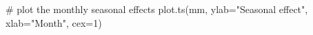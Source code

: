 \begin{Schunk}
\begin{Sinput}
 # plot the monthly seasonal effects
 plot.ts(mm, ylab="Seasonal effect", xlab="Month", cex=1)
\end{Sinput}
\end{Schunk}
